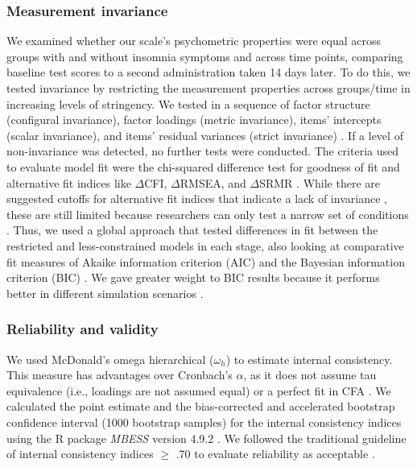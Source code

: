 \documentclass[
  12pt,
  twoside,
  openright,
  a4paper,
  chapter=TITLE,
  section=TITLE,
  brazil]{abntex2}
\begin{document}
\hypertarget{measurement-invariance}{%
\subsubsection{Measurement invariance}\label{measurement-invariance}}

We examined whether our scale's psychometric properties were equal
across groups with and without insomnia symptoms and across time points,
comparing baseline test scores to a second administration taken 14 days
later. To do this, we tested invariance by restricting the measurement
properties across groups/time in increasing levels of stringency. We
tested in a sequence of factor structure (configural invariance), factor
loadings (metric invariance), items' intercepts (scalar invariance), and
items' residual variances (strict invariance) \autocite{flake2021}. If a
level of non-invariance was detected, no further tests were conducted.
The criteria used to evaluate model fit were the chi-squared difference
test for goodness of fit and alternative fit indices like \(\Delta\)CFI,
\(\Delta\)RMSEA, and \(\Delta\)SRMR \autocite{putnick2016}. While there
are suggested cutoffs for alternative fit indices that indicate a lack
of invariance \autocites[e.g.,][]{cheung2002,meade2008,chen2007}, these
are still limited because researchers can only test a narrow set of
conditions \autocite{putnick2016}. Thus, we used a global approach that
tested differences in fit between the restricted and less-constrained
models in each stage, also looking at comparative fit measures of Akaike
information criterion (AIC) and the Bayesian information criterion (BIC)
\autocite{mackinnon2022}. We gave greater weight to BIC results because
it performs better in different simulation scenarios \autocite{lin2017}.

\hypertarget{reliability-and-validity}{%
\subsubsection{Reliability and
validity}\label{reliability-and-validity}}

We used McDonald's omega hierarchical (\(\omega_h\)) to estimate
internal consistency. This measure has advantages over Cronbach's
\(\alpha\), as it does not assume tau equivalence (i.e., loadings are
not assumed equal) or a perfect fit in CFA \autocite{kelley2016}. We
calculated the point estimate and the bias-corrected and accelerated
bootstrap confidence interval (1000 bootstrap samples) for the internal
consistency indices using the R package \emph{MBESS} version 4.9.2
\autocite{MBESS}. We followed the traditional guideline of internal
consistency indices \(\ge\) .70 to evaluate reliability as acceptable
\autocite{kline1986}.
\end{document}
